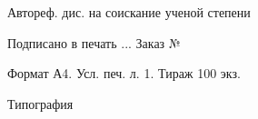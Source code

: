 \documentclass[a4paper,14pt,oneside,openany,article]{memoir} %
\begin{document}
\gappto\captionsrussian{} %



\newpage\thispagestyle{empty}

\vspace*{0pt plus1fill}

\small
\begin{center}
    \textit{\thesisAuthor}
    \par\medskip

    \thesisTitle
    \par\medskip

    Автореф. дис. на соискание ученой степени \thesisDegreeShort
    \par\bigskip

    Подписано в печать \blank[\widthof{999}].\blank[\widthof{999}].\blank[\widthof{99999}].
    Заказ № \blank[\widthof{999999999999}]

    Формат А4. Усл. печ. л. 1. Тираж 100 экз.

    Типография \blank[0.5\linewidth]
\end{center}
\end{document}
